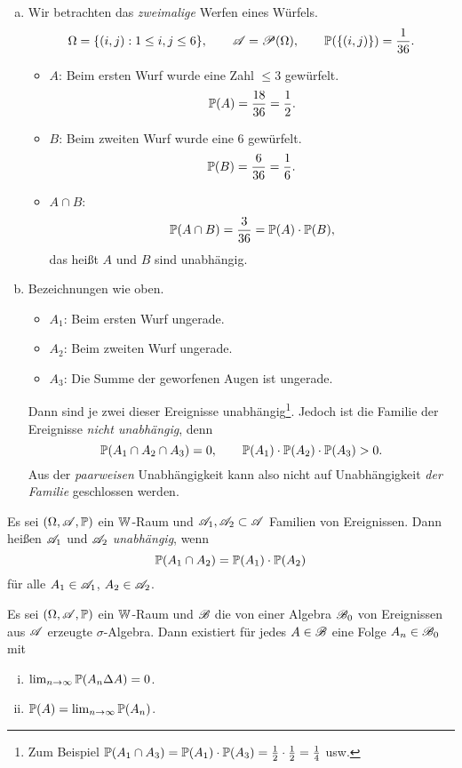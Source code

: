 \begin{exmp}
  \begin{enumerate}[a)]
  \item Wir betrachten das \emph{zweimalige} Werfen eines Würfels.
    \[ \Omega = \{ (i,j) : 1 \le i,j \le 6 \}, \qquad \mathscr{A} = \mathscr{P}(\Omega), \qquad
      \mathbb{P}( \{(i,j)\}) = \frac{1}{36}. \]
    \begin{itemize}
    \item $A$: Beim ersten Wurf wurde eine Zahl $\le 3$ gewürfelt.
      \[ \mathbb{P}(A) = \frac{18}{36} = \frac{1}{2}. \]
    \item $B$: Beim zweiten Wurf wurde eine 6 gewürfelt.
      \[ \mathbb{P}(B) = \frac{6}{36} = \frac{1}{6}. \]
    \item $A \cap B$:
      \[ \mathbb{P}( A \cap B ) = \frac{3}{36} = \mathbb{P}(A) \cdot \mathbb{P}(B), \]
      das heißt $A$ und $B$ sind unabhängig.
    \end{itemize}
  \item Bezeichnungen wie oben.
    \begin{itemize}
    \item $A_1$: Beim ersten Wurf ungerade.
    \item $A_2$: Beim zweiten Wurf ungerade.
    \item $A_3$: Die Summe der geworfenen Augen ist ungerade.
    \end{itemize}
    Dann sind je zwei dieser Ereignisse unabhängig\footnote{%
      Zum Beispiel $\mathbb{P}(A_1 \cap A_3) = \mathbb{P}(A_1) \cdot \mathbb{P}(A_3) = \frac{1}{2} \cdot
      \frac{1}{2} = \frac{1}{4}$ usw.}.
    Jedoch ist die Familie der Ereignisse \emph{nicht unabhängig}, denn
    \[ \mathbb{P}( A_1 \cap A_2 \cap A_3 ) = 0, \qquad \mathbb{P}(A_1) \cdot \mathbb{P}(A_2) \cdot
      \mathbb{P}(A_3) > 0.\]
    Aus der \emph{paarweisen} Unabhängigkeit kann also nicht auf Unabhängigkeit
    \emph{der Familie} geschlossen werden.
  \end{enumerate}
\end{exmp}

\begin{defn}
  Es sei $(\Omega, \mathscr{A}, \mathbb{P})$ ein $\mathbb{W}$-Raum und $\mathscr{A}_1, \mathscr{A}_2 \subset
  \mathscr{A}$ Familien von Ereignissen. Dann heißen $\mathscr{A}_1$ und $\mathscr{A}_2$
  \emph{unabhängig}, wenn
  \[ \mathbb{P}( A_1 \cap A_2 ) = \mathbb{P}(A_1) \cdot \mathbb{P}(A_2) \]
  für alle $A_1 \in \mathscr{A}_1$, $A_2 \in \mathscr{A}_2$.
\end{defn}

\begin{lem}[Approximationssatz]
  Es sei $(\Omega, \mathscr{A}, \mathbb{P})$ ein $\mathbb{W}$-Raum und $\mathscr{B}$ die von einer Algebra
  $\mathscr{B}_0$ von Ereignissen aus $\mathscr{A}$ erzeugte $\sigma$-Algebra. Dann existiert
  für jedes $A \in \mathscr{B}$ eine Folge $A_n \in \mathscr{B}_0$ mit
  \begin{enumerate}[(i)]
  \item $\lim_{n \to \infty} \mathbb{P}( A_n \Delta A ) = 0$.
  \item $\mathbb{P}(A) = \lim_{n \to \infty} \mathbb{P}(A_n)$.
  \end{enumerate}
\end{lem}

